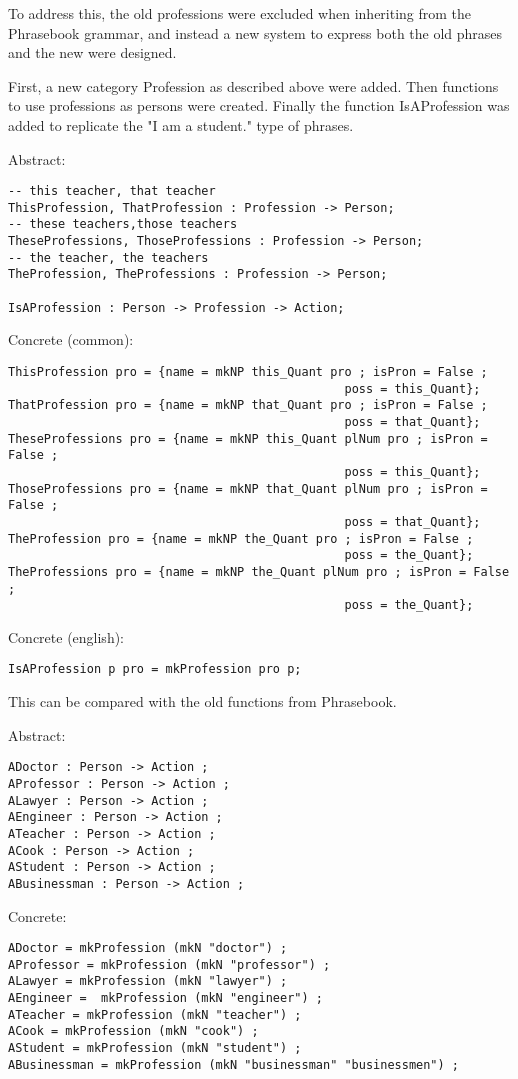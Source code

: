 To address this, the old professions were excluded when inheriting from the Phrasebook grammar, and instead a new system to express both the old phrases and the new were designed.

First, a new category Profession as described above were added. Then functions to use professions as persons were created. Finally the function IsAProfession was added to replicate the "I am a student." type of phrases.

Abstract:
\begin{verbatim}
-- this teacher, that teacher
ThisProfession, ThatProfession : Profession -> Person;
-- these teachers,those teachers
TheseProfessions, ThoseProfessions : Profession -> Person;
-- the teacher, the teachers
TheProfession, TheProfessions : Profession -> Person;

IsAProfession : Person -> Profession -> Action;
\end{verbatim}


Concrete (common):
\begin{verbatim}
ThisProfession pro = {name = mkNP this_Quant pro ; isPron = False ;
                                               poss = this_Quant};
ThatProfession pro = {name = mkNP that_Quant pro ; isPron = False ;
                                               poss = that_Quant};
TheseProfessions pro = {name = mkNP this_Quant plNum pro ; isPron = False ;
                                               poss = this_Quant};
ThoseProfessions pro = {name = mkNP that_Quant plNum pro ; isPron = False ;
                                               poss = that_Quant};
TheProfession pro = {name = mkNP the_Quant pro ; isPron = False ;
                                               poss = the_Quant};
TheProfessions pro = {name = mkNP the_Quant plNum pro ; isPron = False ;
                                               poss = the_Quant};
\end{verbatim}

Concrete (english):
\begin{verbatim}
IsAProfession p pro = mkProfession pro p;
\end{verbatim}

This can be compared with the old functions from Phrasebook.

Abstract:
\begin{verbatim}
ADoctor : Person -> Action ;
AProfessor : Person -> Action ;
ALawyer : Person -> Action ;
AEngineer : Person -> Action ;
ATeacher : Person -> Action ;
ACook : Person -> Action ;
AStudent : Person -> Action ;
ABusinessman : Person -> Action ;
\end{verbatim}

Concrete:
\begin{verbatim}
ADoctor = mkProfession (mkN "doctor") ;
AProfessor = mkProfession (mkN "professor") ;
ALawyer = mkProfession (mkN "lawyer") ;
AEngineer =  mkProfession (mkN "engineer") ;
ATeacher = mkProfession (mkN "teacher") ;
ACook = mkProfession (mkN "cook") ;
AStudent = mkProfession (mkN "student") ;
ABusinessman = mkProfession (mkN "businessman" "businessmen") ;
\end{verbatim}
